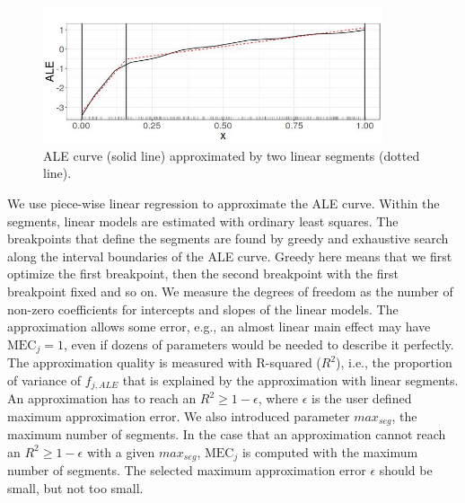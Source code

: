 \documentclass[runningheads]{llncs}\usepackage[]{graphicx}\usepackage[]{color}
\newenvironment{knitrout}{}{} %
\newcommand{\falej}{f_{j,ALE}}                                        %
\begin{document}
%
%
\begin{knitrout}\small
{}\color{fgcolor}\begin{figure}

{\centering \includegraphics[width=10cm,height=4cm]{knit-fig/c-demo-1} 

}

\caption[ALE curve (solid line) approximated by two linear segments (dotted line)]{ALE curve (solid line) approximated by two linear segments (dotted line).}\label{fig:c-demo}
\end{figure}


\end{knitrout}
We use piece-wise linear regression to approximate the ALE curve.
Within the segments, linear models are estimated with ordinary least squares.
The breakpoints that define the segments are found by greedy and exhaustive search along the interval boundaries of the ALE curve.
Greedy here means that we first optimize the first breakpoint, then the second breakpoint with the first breakpoint fixed and so on.
We measure the degrees of freedom as the number of non-zero coefficients for intercepts and slopes of the linear models.
The approximation allows some error, e.g., an almost linear main effect may have $\text{MEC}_j=1$, even if dozens of parameters would be needed to describe it perfectly. 
The approximation quality is measured with R-squared ($R^2$), i.e., the proportion of variance of $\falej$ that is explained by the approximation with linear segments.
An approximation has to reach an $R^2 \geq 1-\epsilon$, where $\epsilon$ is the user defined maximum approximation error.
We also introduced parameter $max_{seg}$, the maximum number of segments.
In the case that an approximation cannot reach an $R^2 \geq 1-\epsilon$ with a given $max_{seg}$, $\text{MEC}_j$ is computed with the maximum number of segments.
The selected maximum approximation error $\epsilon$ should be small, but not too small.
\end{document}
